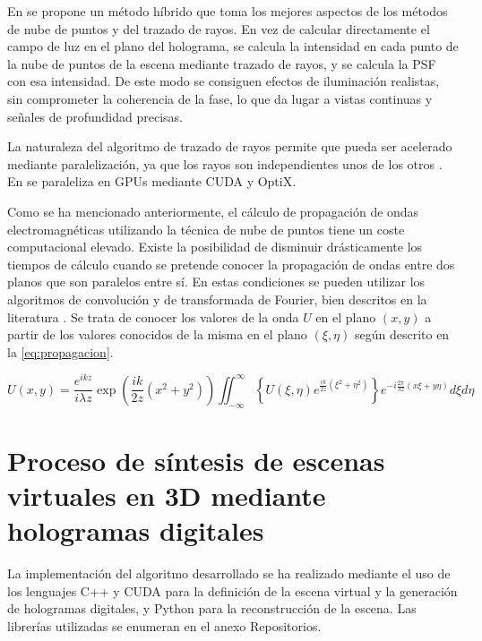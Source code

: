 \documentclass[10pt, a4paper]{article}
\begin{document}
En \cite{Blinder:2021} se propone un método híbrido que toma los mejores aspectos de los métodos de nube de puntos y del trazado de rayos. En vez de calcular directamente el campo de luz en el plano del holograma, se calcula la intensidad en cada punto de la nube de puntos de la escena mediante trazado de rayos, y se calcula la PSF con esa intensidad. De este modo se consiguen efectos de iluminación realistas, sin comprometer la coherencia de la fase, lo que da lugar a vistas continuas y señales de profundidad precisas.

La naturaleza del algoritmo de trazado de rayos permite que pueda ser acelerado mediante paralelización, ya que los rayos son independientes unos de los otros \cite{Chalmers:2002}. En \cite{Blinder:2021} se paraleliza en GPUs mediante CUDA y OptiX.

Como se ha mencionado anteriormente, el cálculo de propagación de ondas electromagnéticas utilizando la técnica de nube de puntos tiene un coste computacional elevado. Existe la posibilidad de disminuir drásticamente los tiempos de cálculo cuando se pretende conocer la propagación de ondas entre dos planos que son paralelos entre sí. En estas condiciones se pueden utilizar los algoritmos de convolución y de transformada de Fourier, bien descritos en la literatura \cite{Goodman:2017}. Se trata de conocer los valores de la onda $U$ en el plano $(x,y)$ a partir de los valores conocidos de la misma en el plano $(\xi, \eta)$ según descrito en la \autoref{eq:propagacion}. 

\begin{equation}
U(x, y)=\frac{e^{i k z}}{i \lambda z} \exp \left(\frac{i k}{2 z}\left(x^2+y^2\right)\right) \iint_{-\infty}^{\infty}\left\{U(\xi, \eta) e^{\frac{i k}{2 z}\left(\xi^2+\eta^2\right)}\right\} e^{-i \frac{2 \pi}{\lambda z}(x \xi+y \eta)} d \xi d \eta
\label{eq:propagacion}
\end{equation}

\section{Proceso de síntesis de escenas virtuales en 3D mediante hologramas digitales}

La implementación del algoritmo desarrollado se ha realizado mediante el uso de los lenguajes C++ y CUDA para la definición de la escena virtual y la generación de hologramas digitales, y Python para la reconstrucción de la escena. Las librerías utilizadas se enumeran en el anexo Repositorios.
\end{document}
